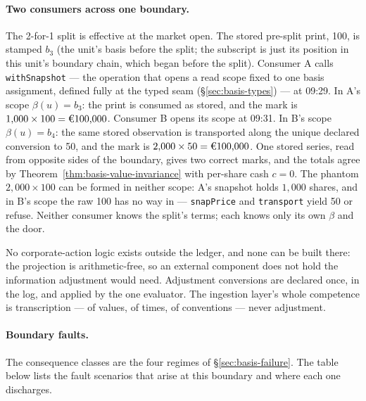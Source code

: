 \paragraph{Two consumers across one boundary.} The 2-for-1 split is effective at
the market open. The stored pre-split print, 100, is stamped $b_3$ (the unit's basis before the
split; the subscript is just its position in this unit's boundary chain, which began
before the split). Consumer A
calls \texttt{withSnapshot} --- the operation that opens a read scope fixed to
one basis assignment, defined fully at the typed seam
(\S\ref{sec:basis-types}) --- at 09:29. In A's scope $\beta(u)=b_3$: the print is
consumed as stored, and the mark is $1{,}000\times100=\EUR{100{,}000}$. Consumer
B opens its scope at 09:31. In B's scope $\beta(u)=b_4$: the same stored
observation is transported along the unique declared conversion to 50, and the
mark is $2{,}000\times50=\EUR{100{,}000}$. One stored series, read from opposite
sides of the boundary, gives two correct marks, and the totals agree by
Theorem~\ref{thm:basis-value-invariance} with per-share cash $c=0$. The phantom
$2{,}000\times100$ can be formed in neither scope: A's snapshot holds $1{,}000$
shares, and in B's scope the raw 100 has no way in --- \texttt{snapPrice} and
\texttt{transport} yield 50 or refuse. Neither consumer knows the split's terms;
each knows only its own $\beta$ and the door.

No corporate-action logic exists outside the ledger, and none can be built
there: the projection is arithmetic-free, so an external component does not hold
the information adjustment would need. Adjustment conversions are declared once,
in the log, and applied by the one evaluator. The ingestion layer's whole
competence is transcription --- of values, of times, of conventions --- never
adjustment.

\paragraph{Boundary faults.} The consequence classes are the four regimes of
\S\ref{sec:basis-failure}. The table below lists the fault scenarios that arise
at this boundary and where each one discharges.

